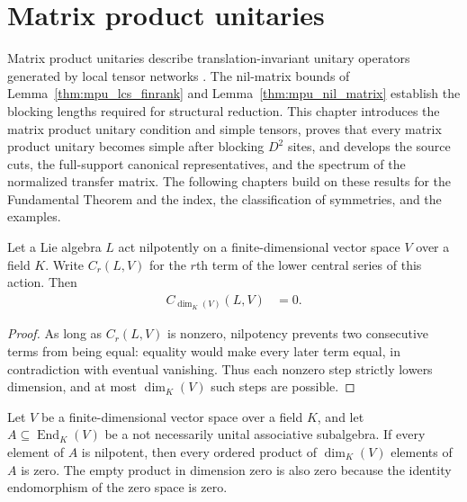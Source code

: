 \chapter{Matrix product unitaries}\label{ch:mpu}

Matrix product unitaries describe translation-invariant unitary operators
generated by local tensor networks \cite{Cirac2017MPU}. The nil-matrix bounds
of Lemma~\ref{thm:mpu_lcs_finrank} and Lemma~\ref{thm:mpu_nil_matrix}
establish the blocking lengths required for structural reduction.
This chapter introduces the matrix product unitary condition and simple
tensors, proves that every matrix product unitary becomes simple after blocking
$D^2$ sites, and develops the source cuts, the full-support canonical
representatives, and the spectrum of the normalized transfer matrix. The
following chapters build on these results for the Fundamental Theorem and the
index, the classification of symmetries, and the examples.

\begin{lemma}
    \label{thm:mpu_lcs_finrank}
    \leanok
    Let a Lie algebra $L$ act nilpotently on a finite-dimensional vector space
    $V$ over a field $K$.  Write $C_r(L,V)$ for the $r$th term of the lower
    central series of this action.  Then
    \begin{align}
        C_{\dim_K(V)}(L,V) & = 0.
    \end{align}
\end{lemma}

\begin{proof}\leanok
    As long as $C_r(L,V)$ is nonzero, nilpotency prevents two consecutive
    terms from being equal: equality would make every later term equal, in
    contradiction with eventual vanishing.  Thus each nonzero step strictly
    lowers dimension, and at most $\dim_K(V)$ such steps are possible.
\end{proof}

\begin{lemma}
    \label{thm:mpu_nil_matrix}
    \leanok
    Let $V$ be a finite-dimensional vector space over a field $K$, and let
    $A\subseteq\operatorname{End}_K(V)$ be a not necessarily unital
    associative subalgebra.  If every element of $A$ is nilpotent, then every
    ordered product of $\dim_K(V)$ elements of $A$ is zero.  The empty product
    in dimension zero is also zero because the identity endomorphism of the
    zero space is zero.
\end{lemma}

